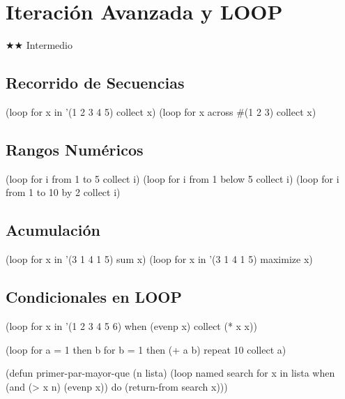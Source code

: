 \chapter{Iteración Avanzada y LOOP}
\label{chap:loop-advanced}
{\huge$\bigstar$}{\huge$\bigstar$} Intermedio

\section{Recorrido de Secuencias}
\begin{lispcode}
(loop for x in '(1 2 3 4 5) collect x)
(loop for x across \#(1 2 3) collect x)
\end{lispcode}

\section{Rangos Numéricos}
\begin{lispcode}
(loop for i from 1 to 5 collect i)
(loop for i from 1 below 5 collect i)
(loop for i from 1 to 10 by 2 collect i)
\end{lispcode}

\section{Acumulación}
\begin{lispcode}
(loop for x in '(3 1 4 1 5) sum x)
(loop for x in '(3 1 4 1 5) maximize x)
\end{lispcode}

\section{Condicionales en LOOP}
\begin{lispcode}
(loop for x in '(1 2 3 4 5 6) when (evenp x) collect (* x x))
\end{lispcode}

\begin{examplebox}[title=Fibonacci con = y then]
\begin{lispcode}
(loop for a = 1 then b for b = 1 then (+ a b) repeat 10 collect a)
\end{lispcode}
\end{examplebox}

\begin{examplebox}[title=LOOP named con return-from]
\begin{lispcode}
(defun primer-par-mayor-que (n lista)
  (loop named search for x in lista
        when (and (> x n) (evenp x)) do (return-from search x)))
\end{lispcode}
\end{examplebox}

